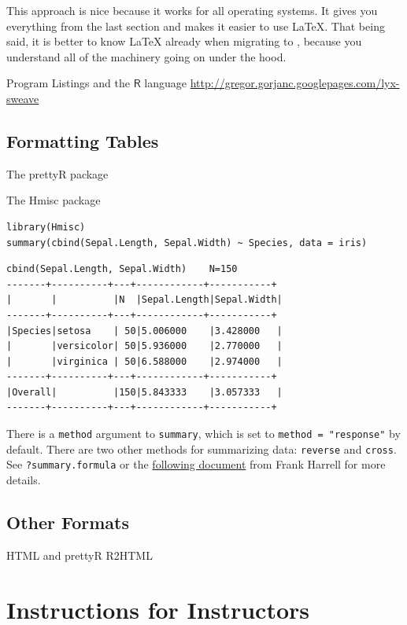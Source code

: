 \documentclass[captions=tableheading]{scrbook}
\begin{document}
\begin{example}
This approach is nice because it works for all operating  systems. It gives you everything from the last section and makes it easier to use \LaTeX{}. That being said, it is better to know \LaTeX{} already when migrating to \LyX{}, because you understand all of the machinery going on under the hood.

Program Listings and the \(\mathsf{R}\) language
\href{http://gregor.gorjanc.googlepages.com/lyx-sweave}{http://gregor.gorjanc.googlepages.com/lyx-sweave}
\section{Formatting Tables}
\label{sec-22-3}
\label{sec-Formatting-Tables}


The prettyR package 

The Hmisc package


\begin{verbatim}
library(Hmisc)
summary(cbind(Sepal.Length, Sepal.Width) ~ Species, data = iris)
\end{verbatim}


\begin{verbatim}
cbind(Sepal.Length, Sepal.Width)    N=150
-------+----------+---+------------+-----------+
|       |          |N  |Sepal.Length|Sepal.Width|
-------+----------+---+------------+-----------+
|Species|setosa    | 50|5.006000    |3.428000   |
|       |versicolor| 50|5.936000    |2.770000   |
|       |virginica | 50|6.588000    |2.974000   |
-------+----------+---+------------+-----------+
|Overall|          |150|5.843333    |3.057333   |
-------+----------+---+------------+-----------+
\end{verbatim}

There is a \texttt{method} argument to \texttt{summary}, which is set to \texttt{method = "response"} by default. There are two other methods for summarizing data: \texttt{reverse} and \texttt{cross}. See \texttt{?summary.formula} or the \href{http://biostat.mc.vanderbilt.edu/twiki/bin/view/Main/StatReport}{following document} from Frank Harrell for more details.
\section{Other Formats}
\label{sec-22-4}
\label{sec-Other-Formats}


HTML and prettyR
R2HTML
\chapter{Instructions for Instructors}
\label{sec-23}
\label{cha-Instructions-for-Instructors}



\end{example}
\end{document}
